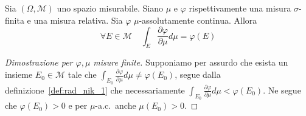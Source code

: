 \begin{theorem}
    Sia \((\Omega, \mathcal{M})\) uno spazio misurabile. Siano \(\mu\) e
    \(\varphi\) rispettivamente una misura \(\sigma\)-finita e una misura
    relativa. Sia \(\varphi \) \(\mu\)-assolutamente continua. Allora
    \[
        \forall E \in \mathcal{M} \quad \int_E \frac{\partial \varphi }{\partial
        \mu} d\mu = \varphi(E)
    \]
\end{theorem}
\begin{proof}[Dimostrazione per \(\varphi , \mu\) misure finite]
    Supponiamo per assurdo che esista un insieme \(E_{0} \in \mathcal{M}\) tale
    che \(\int_{E_{0}} \frac{\partial \varphi }{\partial \mu} d\mu \neq \varphi
    (E_{0})\), segue dalla definizione~\ref{def:rad_nik_1} che necessariamente
    \(\int_{E_{0}} \frac{\partial \varphi }{\partial
    \mu} d\mu < \varphi (E_{0})\). Ne segue che \(\varphi (E_{0}) >0\) e per
    \(\mu\)-a.c.~anche \(\mu(E_{0}) > 0\).


\end{proof}
